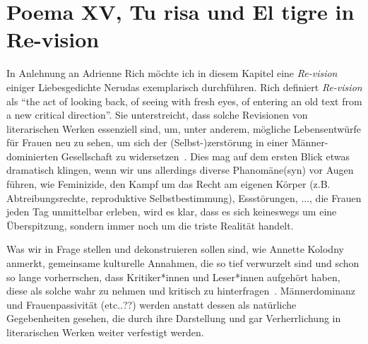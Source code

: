 \section{Poema XV, Tu risa und El tigre in Re-vision}


\begin{comment}
[Kolodny1980]
* die von der Gesellschaft angesehenen Werte werden in unsere Lektüren reinprojiziert.
--> Weiterführend (Laurie Penny) Die Gesellschaft sagt uns, dass romantische Liebe schick und erstrebenswert (vor allem für Frauen) ist, dass sie sich nur darin als Menschen verwirklichen können.
--> Also projizieren Leser*innen (und wirklich auch *innen!) diese Werte in Nerudas Liebeslyrik und feiern sie

* Und anders rum: die Kunst hilft auch diese Normen zu verfestigen/untermauern/bekräftigen
"not only the mirroring of life in art, but also the normative
impact of art on life."
\end{comment}


In Anlehnung an Adrienne Rich möchte ich in diesem Kapitel eine \textit{Re-vision} einiger Liebesgedichte Nerudas exemplarisch durchführen.
Rich definiert \textit{Re-vision} als ``the act of looking back, of seeing with fresh eyes, of entering an old text from a new critical direction''.
Sie unterstreicht, dass solche Revisionen von literarischen Werken essenziell sind, um, unter anderem, mögliche Lebensentwürfe für Frauen neu zu sehen, um sich der (Selbst-)zerstörung in einer Männer-dominierten Gesellschaft zu widersetzen~\cite{Rich1972}.
Dies mag auf dem ersten Blick etwas dramatisch klingen, wenn wir uns allerdings diverse Phanomäne(syn) vor Augen führen, wie Feminizide, den Kampf um das Recht am eigenen Körper (z.B. Abtreibungsrechte, reproduktive Selbstbestimmung), Essstörungen, ..., die Frauen jeden Tag unmittelbar erleben, wird es klar, dass es sich keineswegs um eine Überspitzung, sondern immer noch um die triste Realität handelt.

Was wir in Frage stellen und dekonstruieren sollen sind, wie Annette Kolodny anmerkt, gemeinsame kulturelle Annahmen, die so tief verwurzelt sind und schon so lange vorherrschen, dass Kritiker*innen und Leser*innen aufgehört haben, diese als solche wahr zu nehmen und kritisch zu hinterfragen~\cite{Kolodny1980}.
Männerdominanz und Frauenpassivität (etc..??) werden anstatt dessen als natürliche Gegebenheiten gesehen, die durch ihre Darstellung und gar Verherrlichung in literarischen Werken weiter verfestigt werden.


